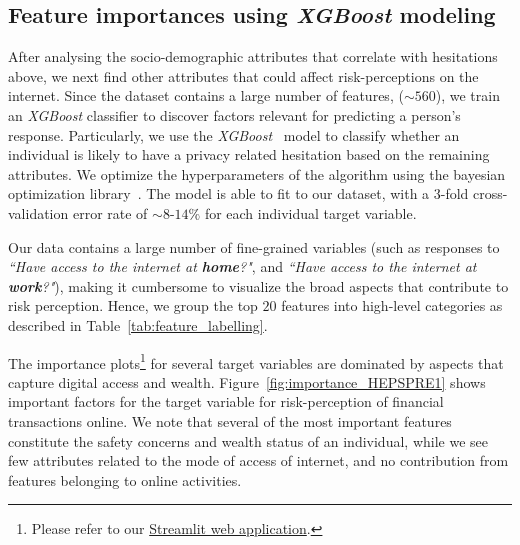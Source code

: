 \documentclass{article}
\theoremstyle{plain}
\theoremstyle{definition}
\theoremstyle{remark}
\begin{document}
\subsection{Feature importances using \emph{XGBoost} modeling}
\label{sec: feat-imp}
After analysing the socio-demographic attributes that correlate with 
hesitations above, we next find other attributes that could affect risk-perceptions on the internet. Since the dataset contains a large number of features, ($\sim560$), we train an \textit{XGBoost} classifier to discover factors relevant for predicting a person's response. Particularly, we use the \textit{XGBoost}~\cite{Chen_2016} model to classify whether an individual is likely to have a privacy related hesitation based on the remaining attributes. We optimize the hyperparameters of the algorithm using the bayesian optimization library~\cite{bayesian_opt}. The model is able to fit to our dataset, with a $3$-fold cross-validation error rate of $\sim8$-$14\%$ for each individual target variable.

Our data contains a large number of fine-grained variables (such as responses to \emph{``Have access to the internet at \textbf{home}?"}, and \emph{``Have access to the internet at \textbf{work}?"}), making it cumbersome to visualize the broad aspects that contribute to risk perception. Hence, we group the top $20$ features into high-level categories as described in Table~\ref{tab:feature_labelling}.

The importance plots\footnote{Please refer to our \href{https://datalitproject1.streamlit.app}{Streamlit web application}.} for several target variables are dominated by aspects that capture digital access and wealth. Figure~\ref{fig:importance_HEPSPRE1} shows important factors for the target variable for risk-perception of financial transactions online. We note that several of the most important features constitute the safety concerns and wealth status of an individual, while we see few attributes related to the mode of access of internet, and no contribution from features belonging to online activities. 
\end{document}
